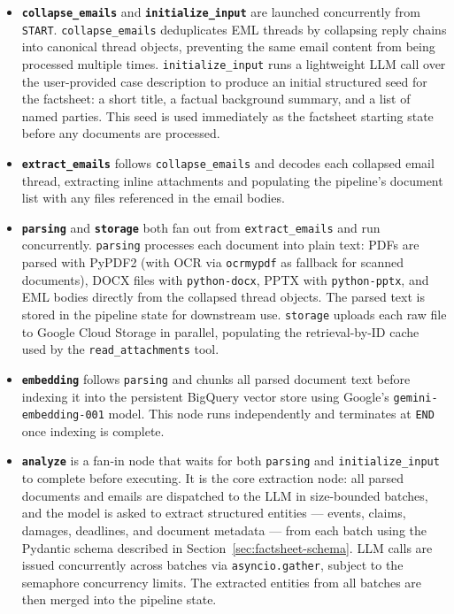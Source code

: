 \begin{itemize}
    \item \textbf{\texttt{collapse\_emails}} and \textbf{\texttt{initialize\_input}} are launched concurrently from \texttt{START}.
    \texttt{collapse\_emails} deduplicates EML threads by collapsing reply chains into canonical thread objects, preventing the same email content from being processed multiple times.
    \texttt{initialize\_input} runs a lightweight LLM call over the user-provided case description to produce an initial structured seed for the factsheet: a short title, a factual background summary, and a list of named parties. This seed is used immediately as the factsheet starting state before any documents are processed.

    \item \textbf{\texttt{extract\_emails}} follows \texttt{collapse\_emails} and decodes each collapsed email thread, extracting inline attachments and populating the pipeline's document list with any files referenced in the email bodies.

    \item \textbf{\texttt{parsing}} and \textbf{\texttt{storage}} both fan out from \texttt{extract\_emails} and run concurrently.
    \texttt{parsing} processes each document into plain text: PDFs are parsed with PyPDF2 (with OCR via \texttt{ocrmypdf} as fallback for scanned documents), DOCX files with \texttt{python-docx}, PPTX with \texttt{python-pptx}, and EML bodies directly from the collapsed thread objects. The parsed text is stored in the pipeline state for downstream use.
    \texttt{storage} uploads each raw file to Google Cloud Storage in parallel, populating the retrieval-by-ID cache used by the \texttt{read\_attachments} tool.

    \item \textbf{\texttt{embedding}} follows \texttt{parsing} and chunks all parsed document text before indexing it into the persistent BigQuery vector store using Google's \texttt{gemini-embedding-001} model. This node runs independently and terminates at \texttt{END} once indexing is complete.

    \item \textbf{\texttt{analyze}} is a fan-in node that waits for both \texttt{parsing} and \texttt{initialize\_input} to complete before executing. It is the core extraction node: all parsed documents and emails are dispatched to the LLM in size-bounded batches, and the model is asked to extract structured entities --- events, claims, damages, deadlines, and document metadata --- from each batch using the Pydantic schema described in Section~\ref{sec:factsheet-schema}. LLM calls are issued concurrently across batches via \texttt{asyncio.gather}, subject to the semaphore concurrency limits. The extracted entities from all batches are then merged into the pipeline state.


\end{itemize}
